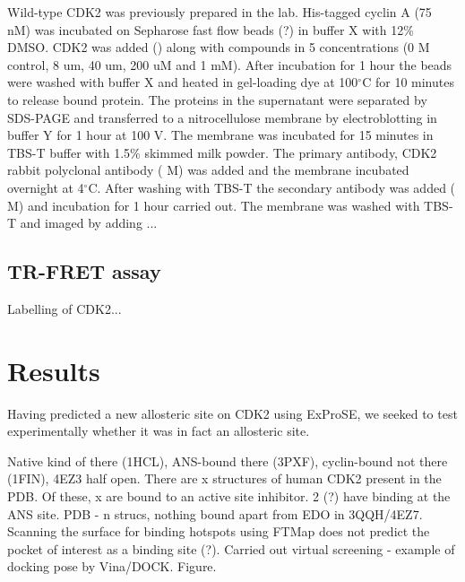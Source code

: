 Wild-type CDK2 was previously prepared in the lab.
His-tagged cyclin A (75 nM) was incubated on Sepharose fast flow beads (?) in buffer X with 12\% DMSO.
CDK2 was added () along with compounds in 5 concentrations (0 M control, 8 um, 40 um, 200 uM and 1 mM).
After incubation for 1 hour the beads were washed with buffer X and heated in gel-loading dye at 100$^{\circ}$C for 10 minutes to release bound protein.
The proteins in the supernatant were separated by SDS-PAGE and transferred to a nitrocellulose membrane by electroblotting in buffer Y for 1 hour at 100 V.
The membrane was incubated for 15 minutes in TBS-T buffer with 1.5\% skimmed milk powder.
The primary antibody, CDK2 rabbit polyclonal antibody ( M) was added and the membrane incubated overnight at 4$^{\circ}$C.
After washing with TBS-T the secondary antibody was added ( M) and incubation for 1 hour carried out.
The membrane was washed with TBS-T and imaged by adding ...


\subsection{TR-FRET assay}

Labelling of CDK2...


\section{Results}

Having predicted a new allosteric site on CDK2 using ExProSE, we seeked to test experimentally whether it was in fact an allosteric site.

Native kind of there (1HCL), ANS-bound there (3PXF), cyclin-bound not there (1FIN), 4EZ3 half open.
There are x structures of human CDK2 present in the PDB.
Of these, x are bound to an active site inhibitor.
2 (?) have binding at the ANS site.
PDB - n strucs, nothing bound apart from EDO in 3QQH/4EZ7.
Scanning the surface for binding hotspots using FTMap \cite{Kozakov2015} does not predict the pocket of interest as a binding site (?).
Carried out virtual screening - example of docking pose by Vina/DOCK.
Figure.


